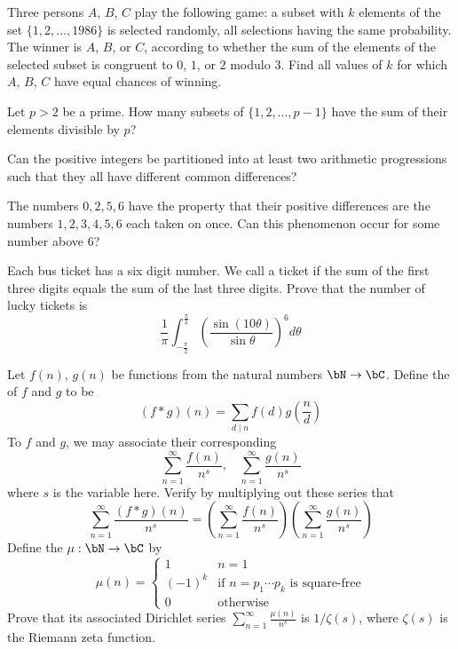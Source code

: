 \documentclass[12pt]{article}
\begin{document}
        \begin{exercise}
        Three persons $A$, $B$, $C$ play the following game: a subset with $k$ elements of the set $\{1,2,\dots,1986\}$ is selected randomly, all selections having the same probability. The winner is $A$, $B$, or $C$, according to whether the sum of the elements of the selected subset is congruent to $0$, $1$, or $2$ modulo $3$. Find all values of $k$ for which $A$, $B$, $C$ have equal chances of winning.
        \end{exercise}

        \begin{exercise}
        Let $p>2$ be a prime. How many subsets of $\{1,2,\dots,p-1\}$ have the sum of their elements divisible by $p$?
        \end{exercise}
        
        \begin{exercise}
        Can the positive integers be partitioned into at least two arithmetic progressions such that they all have different common differences?
        \end{exercise}

        \begin{exercise}
        The numbers $0,2,5,6$ have the property that their positive differences are the numbers $1,2,3,4,5,6$ each taken on once. Can this phenomenon occur for some number above $6$?
        \end{exercise}

        \begin{exercise}
        Each bus ticket has a six digit number. We call a ticket  if the sum of the first three digits equals the sum of the last three digits. Prove that the number of lucky tickets is 
        \[\frac{1}{\pi}\int_{-\frac{\pi}{2}}^{\frac{\pi}{2}}\left(\frac{\sin(10\theta)}{\sin\theta}\right)^6d\theta\]
        \end{exercise}
        
        \begin{exercise}
        Let $f(n)$, $g(n)$ be functions from the natural numbers $\bN\to \bC$. Define the  of $f$ and $g$ to be 
        \[(f*g)(n) = \sum_{d\mid n} f(d)g\left(\frac{n}{d}\right)\] 
        To $f$ and $g$, we may associate their corresponding  
        \[\sum_{n=1}^\infty \frac{f(n)}{n^s},\ \ \ \ \sum_{n=1}^\infty \frac{g(n)}{n^s}\] where $s$ is the variable here. Verify by multiplying out these series that 
        \[\sum_{n=1}^\infty \frac{(f*g)(n)}{n^s} = \left(\sum_{n=1}^\infty \frac{f(n)}{n^s}\right)\left(\sum_{n=1}^\infty \frac{g(n)}{n^s}\right)\]
        Define the  $\mu:\bN\to \bC$ by 
        \[\mu(n)=\begin{cases} 1 & n=1 \\ (-1)^k & \text{if $n=p_1\cdots p_k$ is square-free} \\ 0 & \text{otherwise}\end{cases}\]
        Prove that its associated Dirichlet series $\sum_{n=1}^\infty \frac{\mu(n)}{n^s}$ is $1/\zeta(s)$, where $\zeta(s)$ is the Riemann zeta function. 
        \end{exercise}
\end{document}
